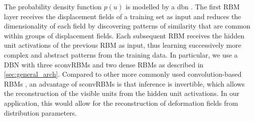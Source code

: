 The probability density function $p(u)$ is modelled by a \gls{dbn}
\citep{hinton2006b}. The first RBM layer receives the displacement fields of a
training set as input and reduces the dimensionality of each field by
discovering patterns of similarity that are common within groups of displacement
fields. Each subsequent RBM receives the hidden unit activations of the previous
RBM as input, thus learning successively more complex and abstract patterns from
the training data. In particular, we use a DBN with three sconvRBMs and two
dense RBMs as described in \ref{sec:general_arch}. Compared to other more
commonly used convolution-based RBMs \citep{lee2009}, an advantage of sconvRBMs
is that inference is invertible, which allows the reconstruction of the visible
units from the hidden unit activations. In our application, this would allow for
the reconstruction of deformation fields from distribution parameters.

